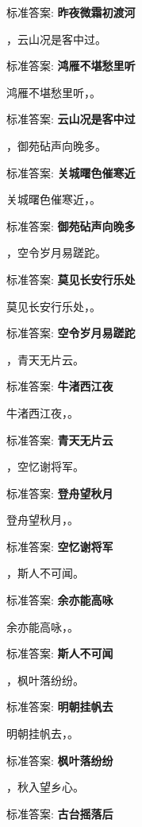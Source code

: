 \documentclass[12pt, a4paper, addpoints]{exam}
\begin{document}
\begin{questions}
标准答案: \textbf{昨夜微霜初渡河}

\question[1] \uline{\qquad\qquad\qquad}，云山况是客中过。

标准答案: \textbf{鸿雁不堪愁里听}

\question[1] 鸿雁不堪愁里听，\uline{\qquad\qquad\qquad}。

标准答案: \textbf{云山况是客中过}

\question[1] \uline{\qquad\qquad\qquad}，御苑砧声向晚多。

标准答案: \textbf{关城曙色催寒近}

\question[1] 关城曙色催寒近，\uline{\qquad\qquad\qquad}。

标准答案: \textbf{御苑砧声向晚多}

\question[1] \uline{\qquad\qquad\qquad}，空令岁月易蹉跎。

标准答案: \textbf{莫见长安行乐处}

\question[1] 莫见长安行乐处，\uline{\qquad\qquad\qquad}。

标准答案: \textbf{空令岁月易蹉跎}

\question[1] \uline{\qquad\qquad\qquad}，青天无片云。

标准答案: \textbf{牛渚西江夜}

\question[1] 牛渚西江夜，\uline{\qquad\qquad\qquad}。

标准答案: \textbf{青天无片云}

\question[1] \uline{\qquad\qquad\qquad}，空忆谢将军。

标准答案: \textbf{登舟望秋月}

\question[1] 登舟望秋月，\uline{\qquad\qquad\qquad}。

标准答案: \textbf{空忆谢将军}

\question[1] \uline{\qquad\qquad\qquad}，斯人不可闻。

标准答案: \textbf{余亦能高咏}

\question[1] 余亦能高咏，\uline{\qquad\qquad\qquad}。

标准答案: \textbf{斯人不可闻}

\question[1] \uline{\qquad\qquad\qquad}，枫叶落纷纷。

标准答案: \textbf{明朝挂帆去}

\question[1] 明朝挂帆去，\uline{\qquad\qquad\qquad}。

标准答案: \textbf{枫叶落纷纷}

\question[1] \uline{\qquad\qquad\qquad}，秋入望乡心。

标准答案: \textbf{古台摇落后}


\end{questions}
\end{document}
